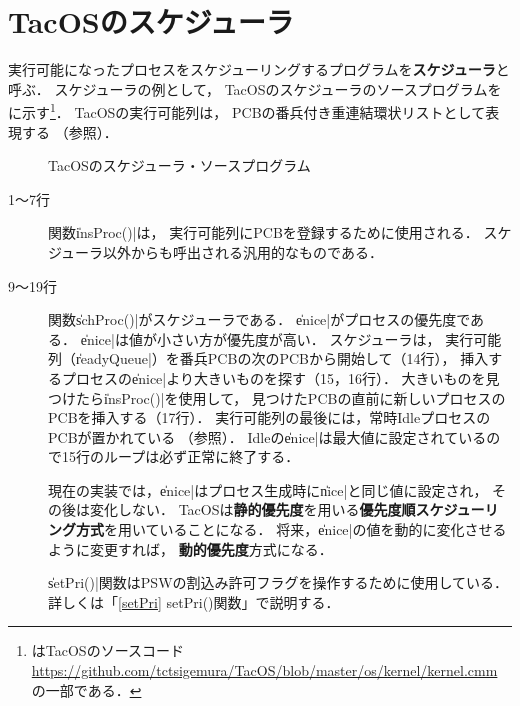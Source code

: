 \section{TacOSのスケジューラ}
実行可能になったプロセスをスケジューリングするプログラムを{\bf スケジューラ}と呼ぶ．
スケジューラの例として，
TacOSのスケジューラのソースプログラムをに示す\footnote{
はTacOSのソースコード
\url{https://github.com/tctsigemura/TacOS/blob/master/os/kernel/kernel.cmm}
の一部である．}．
TacOSの実行可能列は，
PCBの番兵付き重連結環状リストとして表現する
（参照）．

\begin{figure}[btp]

\caption{TacOSのスケジューラ・ソースプログラム}
\label{fig:tacosSch}
\end{figure}

\begin{description}
\item[1〜7行] 関数\|insProc()|は，
実行可能列にPCBを登録するために使用される．
スケジューラ以外からも呼出される汎用的なものである．

\item[9〜19行] 関数\|schProc()|がスケジューラである．
\|enice|がプロセスの優先度である．
\|enice|は値が小さい方が優先度が高い．
スケジューラは，
実行可能列（\|readyQueue|）を番兵PCBの次のPCBから開始して（14行），
挿入するプロセスの\|enice|より大きいものを探す（15，16行）．
大きいものを見つけたら\|insProc()|を使用して，
見つけたPCBの直前に新しいプロセスのPCBを挿入する（17行）．
実行可能列の最後には，常時IdleプロセスのPCBが置かれている
（参照）．
Idleの\|enice|は最大値に設定されているので15行のループは必ず正常に終了する．

現在の実装では，\|enice|はプロセス生成時に\|nice|と同じ値に設定され，
その後は変化しない．
TacOSは{\bf 静的優先度}を用いる{\bf 優先度順スケジューリング方式}を用いていることになる．
将来，\|enice|の値を動的に変化させるように変更すれば，
{\bf 動的優先度}方式になる．

\|setPri()|関数はPSWの割込み許可フラグを操作するために使用している．
詳しくは「\ref{setPri} setPri()関数」で説明する．
\end{description}

